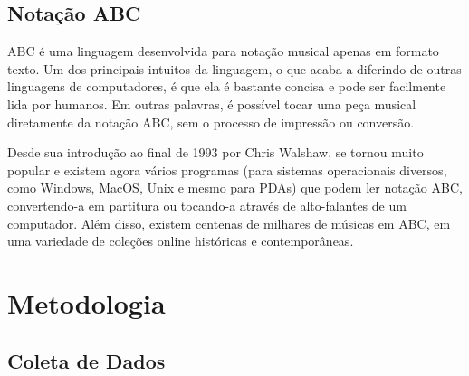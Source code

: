 \documentclass{automatextcc}
\begin{document}


\section{Notação ABC}

ABC é uma linguagem desenvolvida para notação musical apenas em formato texto. Um dos principais intuitos da linguagem, o que acaba a diferindo de outras linguagens de computadores, é que ela é bastante concisa e pode ser facilmente lida por humanos. Em outras palavras, é possível tocar uma peça musical diretamente da notação ABC, sem o processo de impressão ou conversão. 

Desde sua introdução ao final de 1993 por Chris Walshaw, se tornou muito popular e existem agora vários programas (para sistemas operacionais diversos, como Windows, MacOS, Unix e mesmo para PDAs) que podem ler notação ABC, convertendo-a em partitura ou tocando-a através de alto-falantes de um computador. Além disso, existem centenas de milhares de músicas em ABC, em uma variedade de coleções online históricas e contemporâneas.




\chapter{Metodologia}

\section{Coleta de Dados}
\end{document}
